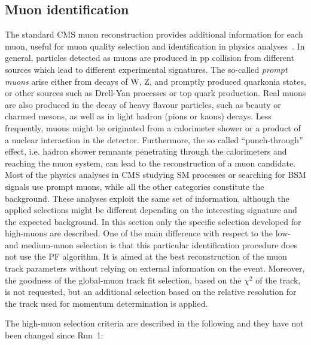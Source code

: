 \subsection{Muon identification}\label{subsec:muonid}

The standard CMS muon reconstruction provides additional information for each muon, useful for muon quality selection and identification in physics analyses~\cite{Chatrchyan:2012xi}. 
In general, particles detected as muons are produced in pp collision from different sources which lead to different experimental signatures. The so-called \textit{prompt muons} arise either from decays of W, Z, and promptly produced quarkonia states, or other sources such as Drell-Yan processes or top quark production. Real muons are also produced in the decay of heavy flavour particles, such as beauty or charmed mesons, as well as in light hadron (pions or kaons) decays. Less frequently, muons might be originated from a calorimeter shower or a product of a nuclear interaction in the detector. Furthermore, the so called ``punch-through'' effect, i.e. hadron shower remnants penetrating through the calorimeters and reaching the muon system, can lead to the reconstruction of a muon candidate. Most of the physics analyses in CMS studying SM processes or searching for BSM signals use prompt muons, while all the other categories constitute the background. These analyses exploit the same set of information, although the applied selections might be different depending on the interesting signature and the expected background. In this section only the specific selection developed for high-\pt muons are described. One of the main difference with respect to the low- and medium-\pt muon selection is that this particular identification procedure does not use the PF algorithm. It is aimed at the best reconstruction of the muon track parameters without relying on external information on the event. Moreover, the goodness of the global-muon track fit selection, based on the $\chi^2$ of the track, is not requested, but an additional selection based on the relative \pt resolution for the track used for momentum determination is applied. 

The high-\pt muon selection criteria are described in the following and they have not been changed since Run~1:

